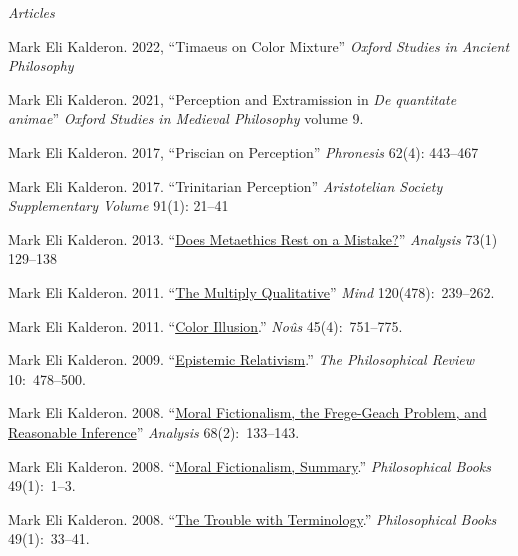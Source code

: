 \documentclass[11pt]{article}
\begin{document}
\normalsize

\bigskip
\noindent\emph{Articles \vspace{0.05in}}
 

\ind Mark Eli Kalderon. 2022, ``Timaeus on Color Mixture'' \emph{Oxford Studies in Ancient Philosophy}

\ind Mark Eli Kalderon. 2021, ``Perception and Extramission in \emph{De quantitate animae}'' \emph{Oxford Studies in Medieval Philosophy} volume 9.

\ind Mark Eli Kalderon. 2017, ``Priscian on Perception'' \emph{Phronesis} 62(4): 443--467

\ind Mark Eli Kalderon. 2017. ``Trinitarian Perception'' \emph{Aristotelian Society Supplementary Volume} 91(1): 21--41

\ind Mark Eli Kalderon. 2013. ``\href{http://dx.doi.org/10.1093/analys/ans147}{Does Metaethics Rest on a Mistake?}'' \emph{Analysis} 73(1) 129--138

\ind Mark Eli Kalderon. 2011. ``\href{http://mind.oxfordjournals.org/content/120/478/239.full.pdf+html}{The Multiply Qualitative}'' \emph{Mind} 120(478):~239--262. 

\ind Mark Eli Kalderon. 2011. ``\href{http://onlinelibrary.wiley.com/doi/10.1111/j.1468-0068.2010.00781.x/pdf}{Color Illusion}.''
 \emph{No{\^u}s} 45(4):~751--775.

\ind Mark Eli Kalderon. 2009. ``\href{http://philreview.dukejournals.org/content/118/2/225.full.pdf+html}{Epistemic Relativism}.'' \emph{The Philosophical Review} 10:~478--500. 

\ind Mark Eli Kalderon. 2008. ``\href{http://onlinelibrary.wiley.com/doi/10.1111/j.1467-8284.2007.00728.x/full}{Moral Fictionalism, the Frege-Geach Problem, and Reasonable Inference}'' \emph{Analysis} 68(2):~133--143. 


\ind Mark Eli Kalderon. 2008. ``\href{http://onlinelibrary.wiley.com/doi/10.1111/j.1468-0149.2008.454_1.x/pdf}{Moral Fictionalism, Summary}.'' \emph{Philosophical Books} 49(1):~1--3.


\ind Mark Eli Kalderon. 2008.  ``\href{http://onlinelibrary.wiley.com/doi/10.1111/j.1468-0149.2008.454_5.x/abstract}{The Trouble with Terminology}.'' \emph{Philosophical Books} 49(1):~33--41.
\end{document}

